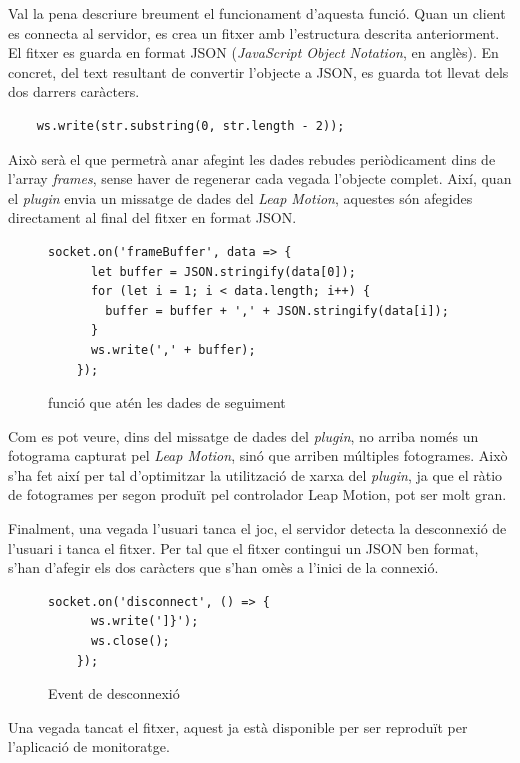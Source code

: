 \documentclass[12pt,a4paper,catalan]{article}
\begin{document}
	Val la pena descriure breument el funcionament d'aquesta funció.
	Quan un client es connecta al servidor, es crea un fitxer amb l'estructura descrita anteriorment. El fitxer es guarda en format JSON (\textit{JavaScript Object Notation}, en anglès). En concret, del text resultant de convertir l'objecte a JSON, es guarda tot llevat dels dos darrers caràcters.
	\begin{lstlisting}
	ws.write(str.substring(0, str.length - 2));
	\end{lstlisting}
	Això serà el que permetrà anar afegint les dades rebudes periòdicament dins de l'array \textit{frames}, sense haver de regenerar cada vegada l'objecte complet.
	Així, quan el \textit{plugin} envia un missatge de dades del \textit{Leap Motion}, aquestes són afegides directament al final del fitxer en format JSON.
	\begin{figure}[H]
	\begin{lstlisting}[]
	socket.on('frameBuffer', data => {
	  let buffer = JSON.stringify(data[0]);
	  for (let i = 1; i < data.length; i++) {
	    buffer = buffer + ',' + JSON.stringify(data[i]);
	  }
	  ws.write(',' + buffer);
	});
	\end{lstlisting}
		\caption{funció que atén les dades de seguiment}
		\label{fig:socket-frame-data}
	\end{figure}
	Com es pot veure, dins del missatge de dades del \textit{plugin}, no arriba només un fotograma capturat pel \textit{Leap Motion}, sinó que arriben múltiples fotogrames. Això s'ha fet així per tal d'optimitzar la utilització de xarxa del \textit{plugin}, ja que el ràtio de fotogrames per segon produït pel controlador Leap Motion, pot ser molt gran.
	
	Finalment, una vegada l'usuari tanca el joc, el servidor detecta la desconnexió de l'usuari i tanca el fitxer. Per tal que el fitxer contingui un JSON ben format, s'han d'afegir els dos caràcters que s'han omès a l'inici de la connexió.
	\begin{figure}[H]
	\begin{lstlisting}[]
	socket.on('disconnect', () => {
	  ws.write(']}');
	  ws.close();
	});
	\end{lstlisting}
		\caption{Event de desconnexió}
		\label{fig:socket-disconnect}
	\end{figure}
	Una vegada tancat el fitxer, aquest ja està disponible per ser reproduït per l'aplicació de monitoratge.
\end{document}
